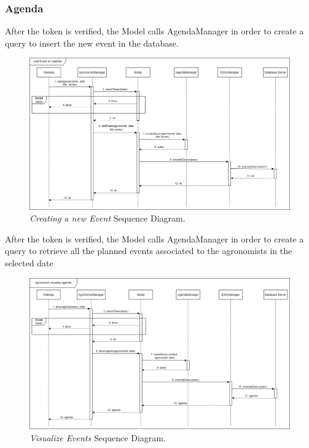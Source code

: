 \subsubsection{Agenda}
After the token is verified, the Model calls AgendaManager in order to create a query to insert the new event in the database.
\begin{figure}[H]
    \centering
    \includegraphics[width=\textwidth]{Images/Sequence Diagram/AgendaNewEvent.png}
    \caption{\textit{Creating a new Event} Sequence Diagram.}
\end{figure}
After the token is verified, the Model calls AgendaManager in order to create a query to retrieve all the planned events associated to the agronomists in the selected date
\begin{figure}[H]
    \centering
    \includegraphics[width=\textwidth]{Images/Sequence Diagram/AgendaVisualize.png}
    \caption{\textit{Visualize Events} Sequence Diagram.}
\end{figure}
